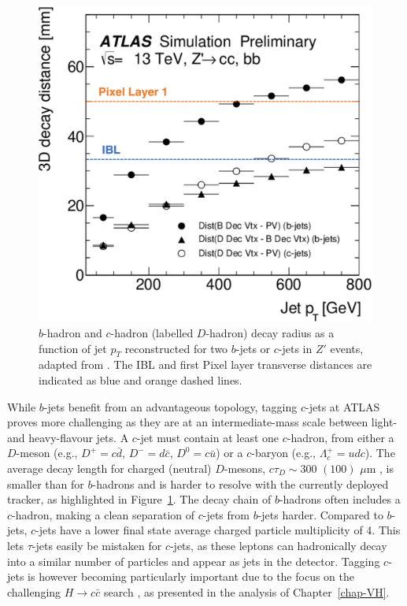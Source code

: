 \begin{figure}[h!]
\begin{minipage}{0.48\textwidth}
  \includegraphics[width=\textwidth]{Images/FTAG/intro/bhaddecay2ada.png}
  \caption{$b$-hadron and $c$-hadron (labelled $D$-hadron) decay radius as a function of jet $p_T$ reconstructed for two $b$-jets or $c$-jets in $Z'$ events, adapted from \cite{ATL-PHYS-PUB-2018-025}. The IBL and first Pixel layer transverse distances are indicated as blue and orange dashed lines.} 
  \label{fig:bhaddecay}
\end{minipage}
\end{figure}

While $b$-jets benefit from an advantageous topology, tagging $c$-jets at ATLAS proves more challenging as they are at an intermediate-mass scale between light- and heavy-flavour jets. A $c$-jet must contain at least one $c$-hadron, from either a $D$-meson (e.g., $D^+=c\bar{d}$, $D^-=d\bar{c}$, $D^0=c\bar{u}$) or a $c$-baryon (e.g., $\Lambda_c^+=udc$). The average decay length for charged (neutral) $D$-mesons, $c\tau_D \sim 300$ $(100)$ $\mu$m \cite{Tanabashi:2018oca}, is smaller than for $b$-hadrons and is harder to resolve with the currently deployed tracker, as highlighted in Figure~\ref{fig:bhaddecay}. The decay chain of $b$-hadrons often includes a $c$-hadron, making a clean separation of $c$-jets from $b$-jets harder. Compared to $b$-jets, $c$-jets have a lower final state average charged particle multiplicity of 4. This lets $\tau$-jets easily be mistaken for $c$-jets, as these leptons can hadronically decay into a similar number of particles and appear as jets in the detector. Tagging $c$-jets is however becoming particularly important due to the focus on the challenging $H \rightarrow c\bar{c}$ search \cite{Aaboud:2018fhh, Collaboration:2721696, arXiv:2205.05550}, as presented in the analysis of Chapter~\ref{chap-VH}. 

